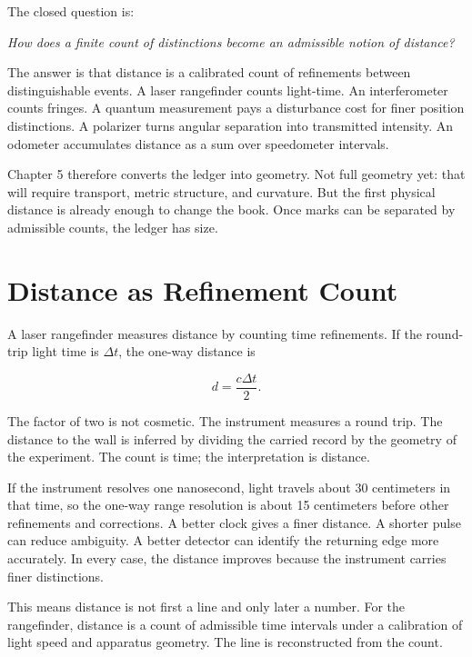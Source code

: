 \begin{chapteressay}
The closed question is:

\begin{center}
\emph{How does a finite count of distinctions become an admissible notion of
distance?}
\end{center}

The answer is that distance is a calibrated count of refinements between
distinguishable events. A laser rangefinder counts light-time. An interferometer
counts fringes. A quantum measurement pays a disturbance cost for finer
position distinctions. A polarizer turns angular separation into transmitted
intensity. An odometer accumulates distance as a sum over speedometer intervals.

Chapter 5 therefore converts the ledger into geometry. Not full geometry yet:
that will require transport, metric structure, and curvature. But the first
physical distance is already enough to change the book. Once marks can be
separated by admissible counts, the ledger has size.

\end{chapteressay}


\section{Distance as Refinement Count}
\label{se:distance-as-refinement-count}

A laser rangefinder measures distance by counting time refinements. If the
round-trip light time is $\Delta t$, the one-way distance is

\[
d = \frac{c \Delta t}{2}.
\]

The factor of two is not cosmetic. The instrument measures a round trip. The
distance to the wall is inferred by dividing the carried record by the geometry
of the experiment. The count is time; the interpretation is distance.

If the instrument resolves one nanosecond, light travels about 30 centimeters
in that time, so the one-way range resolution is about 15 centimeters before
other refinements and corrections. A better clock gives a finer distance. A
shorter pulse can reduce ambiguity. A better detector can identify the returning
edge more accurately. In every case, the distance improves because the
instrument carries finer distinctions.

This means distance is not first a line and only later a number. For the
rangefinder, distance is a count of admissible time intervals under a
calibration of light speed and apparatus geometry. The line is reconstructed
from the count.

